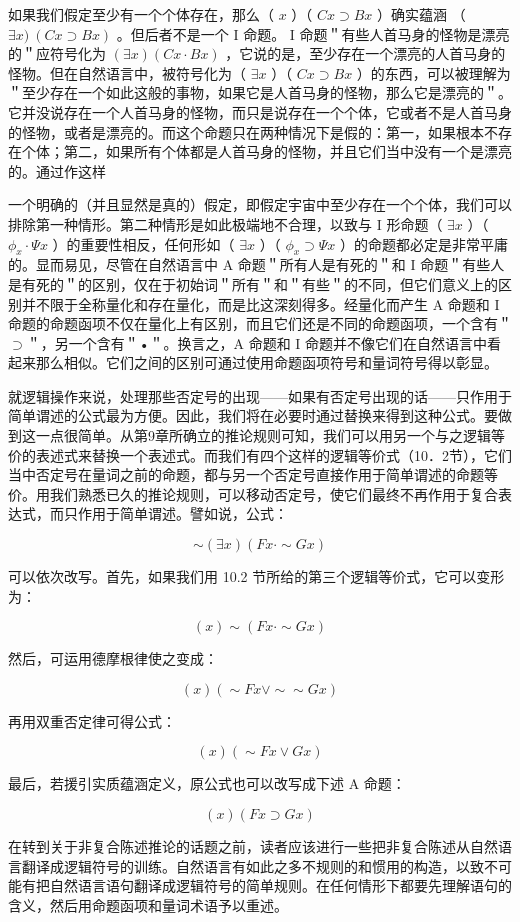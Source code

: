 如果我们假定至少有一个个体存在，那么（ $x$ ）（ $C x \supset B x$ ）确实蕴涵 （ $\exists x) ~(C x \supset B x)$ 。但后者不是一个 I 命题。 I 命题＂有些人首马身的怪物是漂亮的＂应符号化为 $(\exists x)(C x \cdot B x)$ ，它说的是，至少存在一个漂亮的人首马身的怪物。但在自然语言中，被符号化为（ $\exists x$ ）（ $C x \supset B x$ ）的东西，可以被理解为＂至少存在一个如此这般的事物，如果它是人首马身的怪物，那么它是漂亮的＂。它并没说存在一个人首马身的怪物，而只是说存在一个个体，它或者不是人首马身的怪物，或者是漂亮的。而这个命题只在两种情况下是假的：第一，如果根本不存在个体；第二，如果所有个体都是人首马身的怪物，并且它们当中没有一个是漂亮的。通过作这样

一个明确的（并且显然是真的）假定，即假定宇宙中至少存在一个个体，我们可以排除第一种情形。第二种情形是如此极端地不合理，以致与 I 形命题（ $\exists x$ ）（ $\phi_{x} \cdot \Psi x$ ）的重要性相反，任何形如（ $\exists x$ ）（ $\phi_{x} \supset \Psi x$ ）的命题都必定是非常平庸的。显而易见，尽管在自然语言中 A 命题＂所有人是有死的＂和 I 命题＂有些人是有死的＂的区别，仅在于初始词＂所有＂和＂有些＂的不同，但它们意义上的区别并不限于全称量化和存在量化，而是比这深刻得多。经量化而产生 A 命题和 I 命题的命题函项不仅在量化上有区别，而且它们还是不同的命题函项，一个含有＂$\supset$＂，另一个含有＂•＂。换言之，A 命题和 I 命题并不像它们在自然语言中看起来那么相似。它们之间的区别可通过使用命题函项符号和量词符号得以彰显。

就逻辑操作来说，处理那些否定号的出现——如果有否定号出现的话——只作用于简单谓述的公式最为方便。因此，我们将在必要时通过替换来得到这种公式。要做到这一点很简单。从第9章所确立的推论规则可知，我们可以用另一个与之逻辑等价的表述式来替换一个表述式。而我们有四个这样的逻辑等价式（10．2节），它们当中否定号在量词之前的命题，都与另一个否定号直接作用于简单谓述的命题等价。用我们熟悉已久的推论规则，可以移动否定号，使它们最终不再作用于复合表达式，而只作用于简单谓述。譬如说，公式：

$$
\sim(\exists x)(F x \cdot \sim G x)
$$

可以依次改写。首先，如果我们用 10.2 节所给的第三个逻辑等价式，它可以变形为：

$$
(x) \sim(F x \cdot \sim G x)
$$

然后，可运用德摩根律使之变成：

$$
(x)(\sim F x \vee \sim \sim G x)
$$

再用双重否定律可得公式：

$$
(x)(\sim F x \vee G x)
$$

最后，若援引实质蕴涵定义，原公式也可以改写成下述 A 命题：

$$
(x)(F x \supset G x)
$$

在转到关于非复合陈述推论的话题之前，读者应该进行一些把非复合陈述从自然语言翻译成逻辑符号的训练。自然语言有如此之多不规则的和惯用的构造，以致不可能有把自然语言语句翻译成逻辑符号的简单规则。在任何情形下都要先理解语句的含义，然后用命题函项和量词术语予以重述。
